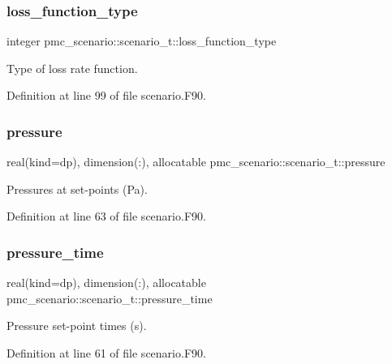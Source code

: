 \subsubsection{\texorpdfstring{loss\+\_\+function\+\_\+type}{loss\_function\_type}}
{\footnotesize\ttfamily integer pmc\+\_\+scenario\+::scenario\+\_\+t\+::loss\+\_\+function\+\_\+type}



Type of loss rate function. 



Definition at line 99 of file scenario.\+F90.

\mbox{\label{structpmc__scenario_1_1scenario__t_a6cff527ba8a1ba3603421f0e779a5edd}} 
\subsubsection{\texorpdfstring{pressure}{pressure}}
{\footnotesize\ttfamily real(kind=dp), dimension(\+:), allocatable pmc\+\_\+scenario\+::scenario\+\_\+t\+::pressure}



Pressures at set-\/points (Pa). 



Definition at line 63 of file scenario.\+F90.

\mbox{\label{structpmc__scenario_1_1scenario__t_a5b4310114f4861343c494c7e218075e3}} 
\subsubsection{\texorpdfstring{pressure\+\_\+time}{pressure\_time}}
{\footnotesize\ttfamily real(kind=dp), dimension(\+:), allocatable pmc\+\_\+scenario\+::scenario\+\_\+t\+::pressure\+\_\+time}



Pressure set-\/point times (s). 



Definition at line 61 of file scenario.\+F90.


